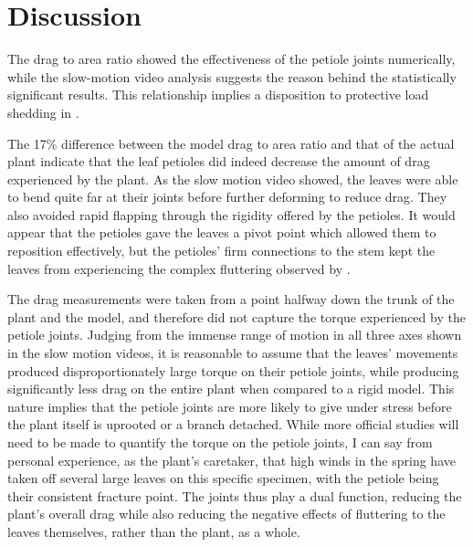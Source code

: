 \section{Discussion}

The drag to area ratio showed the effectiveness of the petiole joints numerically, while the slow-motion video analysis suggests the reason behind the statistically significant results. This relationship implies a disposition to protective load shedding in \Cxparadisi.

The 17\% difference between the model drag to area ratio and that of the actual plant indicate that the leaf petioles did indeed decrease the amount of drag experienced by the plant. As the slow motion video showed, the leaves were able to bend quite far at their joints before further deforming to reduce drag. They also avoided rapid flapping through the rigidity offered by the petioles. It would appear that the petioles gave the leaves a pivot point which allowed them to reposition effectively, but the petioles' firm connections to the stem kept the leaves from experiencing the complex fluttering observed by \citet{miller2012reconfiguration}.

The drag measurements were taken from a point halfway down the trunk of the plant and the model, and therefore did not capture the torque experienced by the petiole joints. Judging from the immense range of motion in all three axes shown in the slow motion videos, it is reasonable to assume that the leaves' movements produced disproportionately large torque on their petiole joints, while producing significantly less drag on the entire plant when compared to a rigid model. This nature implies that the petiole joints are more likely to give under stress before the plant itself is uprooted or a branch detached. While more official studies will need to be made to quantify the torque on the petiole joints, I can say from personal experience, as the plant's caretaker, that high winds in the spring have taken off several large leaves on this specific specimen, with the petiole being their consistent fracture point. The joints thus play a dual function, reducing the plant's overall drag while also reducing the negative effects of fluttering to the leaves themselves, rather than the plant, as a whole.
